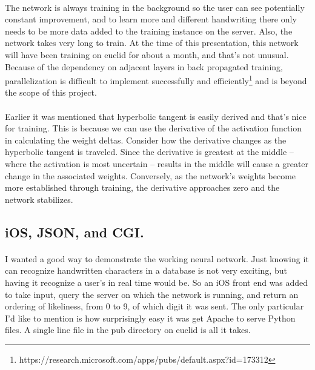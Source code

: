 \documentclass{article}
\begin{document}
    \paragraph{}The network is always training in the background so the user can 
    see potentially constant improvement, and to learn more and different 
    handwriting there only needs to be more data added to the training instance 
    on the server. Also, the network takes very long to train. At the time of this 
    presentation, this network will have been training on euclid for about a 
    month, and that's not unusual. Because of the dependency on 
    adjacent layers in back propagated training, parallelization is difficult to
    implement successfully and efficiently\footnote{
    https://research.microsoft.com/apps/pubs/default.aspx?id=173312} and is beyond
    the scope of this project.

    \paragraph{}Earlier it was mentioned that hyperbolic tangent is easily derived
    and that's nice for training. This is because we can use the derivative of the 
    activation function in calculating the weight deltas. Consider how the 
    derivative changes as the hyperbolic tangent is traveled. Since the derivative 
    is greatest at the middle -- where the activation is most uncertain -- results 
    in the middle will cause a greater change in the associated weights. 
    Conversely, as the network's weights become more established through training, 
    the derivative approaches zero and the network stabilizes.

\subsection{iOS, JSON, and CGI.}

    \paragraph{}I wanted a good way to demonstrate the working neural network. Just
    knowing it can recognize handwritten characters in a database is not very 
    exciting, but having it recognize a user's in real time would be. So an iOS 
    front end was added to take input, query the server on which the network is 
    running, and return an ordering of likeliness, from 0 to 9, of which digit it 
    was sent. The only particular I'd like to mention is how surprisingly easy it 
    was get Apache to serve Python files. A single line file in the pub directory 
    on euclid is all it takes. \\
\end{document}
